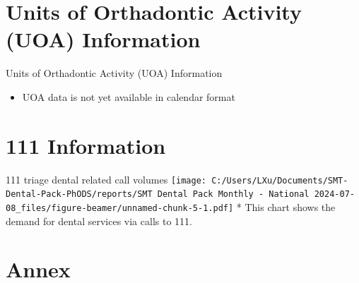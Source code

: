 \documentclass[
  8pt,
  ignorenonframetext,
  aspectratio = 169]{beamer}
\providecommand{\tightlist}{%
  \setlength{\itemsep}{0pt}\setlength{\parskip}{0pt}}
\begin{document}
\hypertarget{units-of-orthadontic-activity-uoa-information}{%
\section{Units of Orthadontic Activity (UOA)
Information}\label{units-of-orthadontic-activity-uoa-information}}

\begin{frame}{Units of Orthadontic Activity (UOA) Information}
\begin{itemize}
\tightlist
\item
  UOA data is not yet available in calendar format
\end{itemize}
\end{frame}

\hypertarget{information}{%
\section{111 Information}\label{information}}

\begin{frame}{111 triage dental related call volumes}
\protect\hypertarget{triage-dental-related-call-volumes}{}
\texttt{[image: C:/Users/LXu/Documents/SMT-Dental-Pack-PhODS/reports/SMT Dental Pack Monthly - National 2024-07-08\_files/figure-beamer/unnamed-chunk-5-1.pdf]}
* This chart shows the demand for dental services via calls to 111.
\end{frame}

\hypertarget{annex}{%
\section{Annex}\label{annex}}
\end{document}
